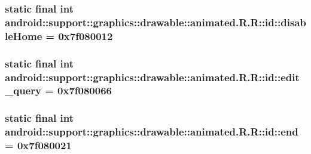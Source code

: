 \hypertarget{classandroid_1_1support_1_1graphics_1_1drawable_1_1animated_1_1_r_1_1id_bb8d65cd2405d0a9ba3fa61c9384a8fc}{
\subsubsection[{disableHome}]{\setlength{\rightskip}{0pt plus 5cm}static final int android::support::graphics::drawable::animated.R.R::id::disableHome = 0x7f080012}}
\label{classandroid_1_1support_1_1graphics_1_1drawable_1_1animated_1_1_r_1_1id_bb8d65cd2405d0a9ba3fa61c9384a8fc}


\hypertarget{classandroid_1_1support_1_1graphics_1_1drawable_1_1animated_1_1_r_1_1id_1299be78ca61ea2cedfa24c975806e8a}{
\subsubsection[{edit\_\-query}]{\setlength{\rightskip}{0pt plus 5cm}static final int android::support::graphics::drawable::animated.R.R::id::edit\_\-query = 0x7f080066}}
\label{classandroid_1_1support_1_1graphics_1_1drawable_1_1animated_1_1_r_1_1id_1299be78ca61ea2cedfa24c975806e8a}


\hypertarget{classandroid_1_1support_1_1graphics_1_1drawable_1_1animated_1_1_r_1_1id_b1025bc614bd18d450d0060a90d180dd}{
\subsubsection[{end}]{\setlength{\rightskip}{0pt plus 5cm}static final int android::support::graphics::drawable::animated.R.R::id::end = 0x7f080021}}
\label{classandroid_1_1support_1_1graphics_1_1drawable_1_1animated_1_1_r_1_1id_b1025bc614bd18d450d0060a90d180dd}


